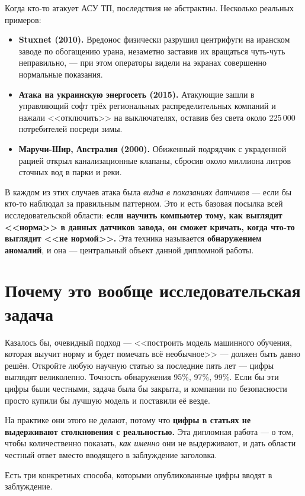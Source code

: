 \documentclass[11pt,a4paper]{article}
\begin{document}
Когда кто-то атакует АСУ ТП, последствия не абстрактны. Несколько реальных примеров:

\begin{itemize}
  \item \textbf{Stuxnet (2010).} Вредонос физически разрушил центрифуги на иранском заводе по обогащению урана, незаметно заставив их вращаться чуть-чуть неправильно, --- при этом операторы видели на экранах совершенно нормальные показания.
  \item \textbf{Атака на украинскую энергосеть (2015).} Атакующие зашли в управляющий софт трёх региональных распределительных компаний и нажали <<отключить>> на выключателях, оставив без света около 225\,000 потребителей посреди зимы.
  \item \textbf{Маручи-Шир, Австралия (2000).} Обиженный подрядчик с украденной рацией открыл канализационные клапаны, сбросив около миллиона литров сточных вод в парки и реки.
\end{itemize}

В каждом из этих случаев атака была \emph{видна в показаниях датчиков} --- если бы кто-то наблюдал за правильным паттерном. Это и есть базовая посылка всей исследовательской области: \textbf{если научить компьютер тому, как выглядит <<норма>> в данных датчиков завода, он сможет кричать, когда что-то выглядит <<не нормой>>.} Эта техника называется \textbf{обнаружением аномалий}, и она --- центральный объект данной дипломной работы.

\section{Почему это вообще исследовательская задача}

Казалось бы, очевидный подход --- <<построить модель машинного обучения, которая выучит норму и будет помечать всё необычное>> --- должен быть давно решён. Откройте любую научную статью за последние пять лет --- цифры выглядят великолепно. Точность обнаружения 95\%, 97\%, 99\%. Если бы эти цифры были честными, задача была бы закрыта, и компании по безопасности просто купили бы лучшую модель и поставили её везде.

На практике они этого не делают, потому что \textbf{цифры в статьях не выдерживают столкновения с реальностью.} Эта дипломная работа --- о том, чтобы количественно показать, \emph{как именно} они не выдерживают, и дать области честный ответ вместо вводящего в заблуждение заголовка.

Есть три конкретных способа, которыми опубликованные цифры вводят в заблуждение.
\end{document}
